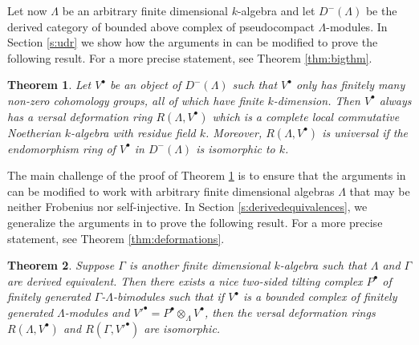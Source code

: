 \documentclass{amsart}
\theoremstyle{plain}
\newtheorem{secthm}{Theorem}[section]
\theoremstyle{definition}
\theoremstyle{remark}
\begin{document}
Let now  $\Lambda$ be an arbitrary finite dimensional $k$-algebra and let $D^-(\Lambda)$ be the derived category
of bounded above complex of pseudocompact $\Lambda$-modules. In Section \ref{s:udr} we show how the arguments in 
\cite{comptes,bcderived} can be modified to prove the following result. For a more precise statement, see Theorem \ref{thm:bigthm}.

\begin{secthm}
\label{thm:main1}
Let $V^\bullet$ be an object of $D^-(\Lambda)$ such that $V^\bullet$ only has finitely many non-zero cohomology groups,
all of which have finite $k$-dimension. Then $V^\bullet$ always has a versal deformation ring $R(\Lambda,V^\bullet)$ 
which is a complete local commutative Noetherian $k$-algebra with residue field $k$. Moreover, $R(\Lambda,V^\bullet)$ is universal 
if the endomorphism ring of $V^\bullet$ in $D^-(\Lambda)$ is isomorphic to $k$.
\end{secthm}

The main challenge of the proof of Theorem \ref{thm:main1} is to ensure that the arguments in \cite{comptes,bcderived}
can be modified to work with arbitrary finite dimensional algebras $\Lambda$ that may be neither Frobenius nor self-injective.
In Section \ref{s:derivedequivalences}, we generalize the arguments in \cite{derivedeq} to prove the following result. 
For a more precise statement, see Theorem \ref{thm:deformations}.

\begin{secthm}
\label{thm:main2}
Suppose $\Gamma$ is another finite dimensional $k$-algebra such that $\Lambda$ and $\Gamma$ are derived equivalent.
Then there exists a nice two-sided tilting complex $P^\bullet$ of finitely generated $\Gamma$-$\Lambda$-bimodules such that
if $V^\bullet$ is a bounded complex of finitely generated $\Lambda$-modules and ${V'}^\bullet=P^\bullet\otimes_\Lambda V^\bullet$,
then the versal deformation rings $R(\Lambda,V^\bullet)$ and $R(\Gamma,{V'}^\bullet)$ are isomorphic.
\end{secthm}
\end{document}
